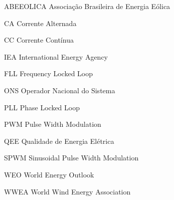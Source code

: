 \begin{siglas}
  \item[ABEEOLICA] Associação Brasileira de Energia Eólica
  \item[CA] Corrente Alternada
  \item[CC] Corrente Contínua
  \item[IEA] International Energy Agency
  \item[FLL] Frequency Locked Loop
  \item[ONS] Operador Nacional do Sistema
  \item[PLL] Phase Locked Loop
  \item[PWM] Pulse Width Modulation
  \item[QEE] Qualidade de Energia Elétrica
  \item[SPWM] Sinusoidal Pulse Width Modulation
  \item[WEO] World Energy Outlook
  \item[WWEA] World Wind Energy Association
\end{siglas}
